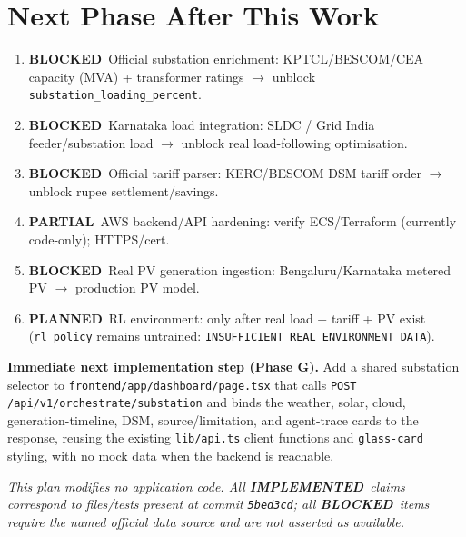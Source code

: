 \documentclass[11pt,a4paper]{article}
\newcommand{\stImpl}{\textcolor{cok}{\textbf{IMPLEMENTED}}}
\newcommand{\stP}{\textcolor{cpart}{\textbf{PARTIAL}}}
\newcommand{\stB}{\textcolor{cmiss}{\textbf{BLOCKED}}}
\newcommand{\stPlan}{\textcolor{cplan}{\textbf{PLANNED}}}
\newcommand{\code}[1]{\texttt{\small #1}}
\begin{document}
\section{Next Phase After This Work}
\begin{enumerate}[leftmargin=1.5em,itemsep=1pt]
  \item \stB\ Official substation enrichment: KPTCL/BESCOM/CEA capacity (MVA) + transformer
        ratings $\rightarrow$ unblock \code{substation\_loading\_percent}.
  \item \stB\ Karnataka load integration: SLDC / Grid India feeder/substation load $\rightarrow$
        unblock real load-following optimisation.
  \item \stB\ Official tariff parser: KERC/BESCOM DSM tariff order $\rightarrow$ unblock rupee
        settlement/savings.
  \item \stP\ AWS backend/API hardening: verify ECS/Terraform (currently code-only); HTTPS/cert.
  \item \stB\ Real PV generation ingestion: Bengaluru/Karnataka metered PV $\rightarrow$ production
        PV model.
  \item \stPlan\ RL environment: only after real load + tariff + PV exist (\code{rl\_policy}
        remains untrained: \code{INSUFFICIENT\_REAL\_ENVIRONMENT\_DATA}).
\end{enumerate}

\noindent\textbf{Immediate next implementation step (Phase G).} Add a shared substation selector to
\code{frontend/app/dashboard/page.tsx} that calls \code{POST /api/v1/orchestrate/substation} and
binds the weather, solar, cloud, generation-timeline, DSM, source/limitation, and agent-trace cards
to the response, reusing the existing \code{lib/api.ts} client functions and \code{glass-card}
styling, with no mock data when the backend is reachable.

\vfill
{\footnotesize\itshape This plan modifies no application code. All \stImpl\ claims correspond to
files/tests present at commit \code{5bed3cd}; all \stB\ items require the named official data source
and are not asserted as available.\par}
\end{document}

